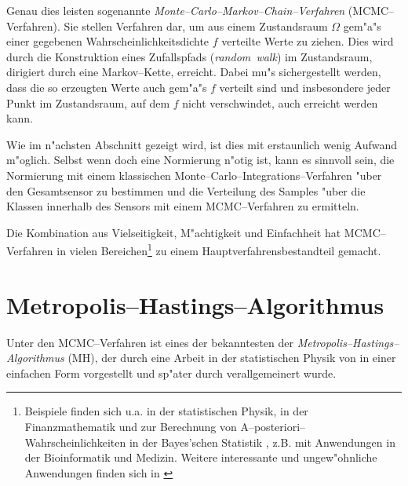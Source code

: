 	Genau dies leisten sogenannte {\em Mon\-te--Car\-lo--Mar\-kov--Chain--Ver\-fahr\-en} (MCMC--Verfahren). Sie stellen Verfahren dar, um aus einem Zustandsraum $\Omega$ gem"a"s einer gegebenen Wahrscheinlichkeitsdichte $f$ verteilte Werte zu ziehen. Dies wird durch die Konstruktion eines Zufallspfads ({\em random~walk}) im Zustandsraum, dirigiert durch eine Markov--Kette, erreicht. Dabei mu"s sichergestellt werden, dass die so erzeugten Werte auch gem"a"s $f$ verteilt sind und insbesondere jeder Punkt im Zustandsraum, auf dem $f$ nicht verschwindet, auch erreicht werden kann.
	
	Wie im n"achsten Abschnitt gezeigt wird, ist dies mit erstaunlich wenig Aufwand m"oglich. Selbst wenn doch eine Normierung n"otig ist, kann es sinnvoll sein, die Normierung mit einem klassischen Monte--Carlo--Integrations--Verfahren "uber den Gesamtsensor zu bestimmen und die Verteilung des Samples "uber die Klassen innerhalb des Sensors mit einem MCMC--Verfahren zu ermitteln.
	
	Die Kombination aus Vielseitigkeit, M"achtigkeit und Einfachheit hat MCMC--Verfahren in vielen Bereichen\footnote{Beispiele finden sich u.a. in der statistischen Physik, in der Finanzmathematik und zur Berechnung von A--posteriori--Wahrscheinlichkeiten in der Bayes'schen Statistik \citep{Geweke:1989p10465}, z.B. mit Anwendungen in der Bioinformatik und Medizin. Weitere interessante und ungew"ohnliche Anwendungen finden sich in \citep{Diaconis:2009p4122}} zu einem Hauptverfahrensbestandteil gemacht.
	
	
	\section{Metropolis--Hastings--Algorithmus}
	Unter den MCMC--Verfahren ist eines der bekanntesten der {\em Metropolis--Hastings--Algorithmus} (MH), der durch eine Arbeit in der statistischen Physik von \citet{Metropolis:1953p3364} in einer einfachen Form vorgestellt und sp"ater durch \citet{Hastings:1970p3387} verallgemeinert wurde.


